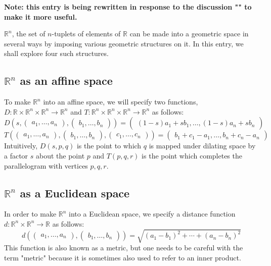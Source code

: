 \documentclass[12pt]{article}
\begin{document}
{\bf Note: this entry is being rewritten in response to the discussion "" to make it more useful.}

$\mathbb{R}^n$, the set of $n$-tuplets of elements of $\mathbb{R}$ can be made into a geometric space in several ways by imposing various geometric structures on it.  In this entry, we shall explore four such structures.

\subsection{$\mathbb{R}^n$ as an affine space}

To make $\mathbb{R}^n$ into an affine space, we will specify two functions, $D \colon \mathbb{R} \times \mathbb{R}^n \times \mathbb{R}^n \to \mathbb{R}^n$ and $T \colon \mathbb{R}^n \times \mathbb{R}^n \times \mathbb{R}^n \to \mathbb{R}^n$ as follows:
 $$D \left( s, \begin{pmatrix} a_1, \ldots,  a_n \end{pmatrix}, \begin{pmatrix} b_1, \ldots, b_n \end{pmatrix} \right) = \begin{pmatrix} (1-s) a_1 + s b_1, \ldots,  (1-s) a_n + s b_n \end{pmatrix}$$
 $$T \left( \begin{pmatrix} a_1, \ldots,  a_n \end{pmatrix}, \begin{pmatrix} b_1, \ldots, b_n \end{pmatrix}, \begin{pmatrix} c_1, \ldots, c_n \end{pmatrix} \right) = \begin{pmatrix} b_1 + c_1 - a_1, \ldots, b_n + c_n - a_n \end{pmatrix}$$
Intuitively, $D (s,p,q)$ is the point to which $q$ is mapped under dilating space by a factor $s$ about the point $p$ and $T(p,q,r)$ is the point which completes the parallelogram with vertices $p,q,r$.

\subsection{$\mathbb{R}^n$ as a Euclidean space}

In order to make $\mathbb{R}^n$ into a Euclidean space, we specify a distance function $d \colon \mathbb{R}^n \times \mathbb{R}^n \to \mathbb{R}$ as follows:
 \[d \left( \begin{pmatrix} a_1, \ldots,  a_n \end{pmatrix}, \begin{pmatrix} b_1, \ldots, b_n \end{pmatrix} \right) = \sqrt{ (a_1-b_1)^2 + \cdots + (a_n-b_n)^2 }\]
This function is also known as a metric, but one needs to be careful with the term "metric" because it is sometimes also used to refer to an inner product.
\end{document}
